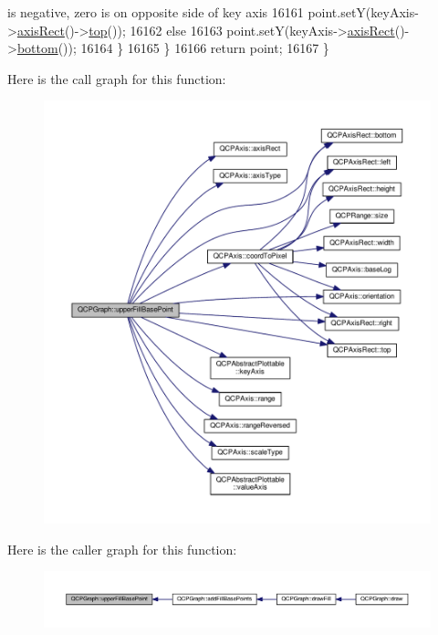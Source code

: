 \begin{DoxyCode}
{       is negative, zero is on opposite side of key axis}
16161         point.setY(keyAxis->\hyperlink{class_q_c_p_axis_aada3102af43b029e3879bcbf2bddfabb}{axisRect}()->\hyperlink{class_q_c_p_axis_rect_ac45aef1eb75cea46b241b6303028a607}{top}());
16162       \textcolor{keywordflow}{else}
16163         point.setY(keyAxis->\hyperlink{class_q_c_p_axis_aada3102af43b029e3879bcbf2bddfabb}{axisRect}()->\hyperlink{class_q_c_p_axis_rect_af2b5982ebe7e6f781b9bf1cc371a60d8}{bottom}());
16164     \}
16165   \}
16166   \textcolor{keywordflow}{return} point;
16167 \}
\end{DoxyCode}


Here is the call graph for this function\+:\nopagebreak
\begin{figure}[H]
\begin{center}
\leavevmode
\includegraphics[width=350pt]{class_q_c_p_graph_a363d066c179e0f46cc93c12bafb0bfba_cgraph}
\end{center}
\end{figure}




Here is the caller graph for this function\+:\nopagebreak
\begin{figure}[H]
\begin{center}
\leavevmode
\includegraphics[width=350pt]{class_q_c_p_graph_a363d066c179e0f46cc93c12bafb0bfba_icgraph}
\end{center}
\end{figure}




